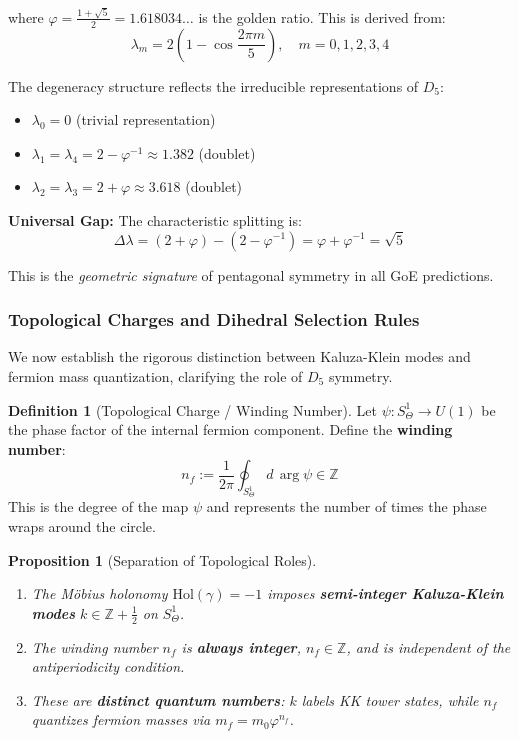 \documentclass[12pt]{article}
\theoremstyle{definition}
\newtheorem{definition}{Definition}
\theoremstyle{plain}
\newtheorem{proposition}{Proposition}
\begin{document}
where $\varphi = \frac{1+\sqrt{5}}{2} = 1.618034\ldots$ is the golden ratio. This is derived from:
\begin{equation}
\lambda_m = 2\left(1 - \cos\frac{2\pi m}{5}\right), \quad m = 0,1,2,3,4
\end{equation}

The degeneracy structure reflects the irreducible representations of $D_5$:
\begin{itemize}
\item $\lambda_0 = 0$ (trivial representation)
\item $\lambda_1 = \lambda_4 = 2 - \varphi^{-1} \approx 1.382$ (doublet)
\item $\lambda_2 = \lambda_3 = 2 + \varphi \approx 3.618$ (doublet)
\end{itemize}

\textbf{Universal Gap:} The characteristic splitting is:
\begin{equation}
\Delta\lambda = (2 + \varphi) - (2 - \varphi^{-1}) = \varphi + \varphi^{-1} = \sqrt{5}
\end{equation}

This is the \textit{geometric signature} of pentagonal symmetry in all GoE predictions.

\subsubsection{Topological Charges and Dihedral Selection Rules}
\label{sec:topological_charges}

We now establish the rigorous distinction between Kaluza-Klein modes and fermion mass quantization, clarifying the role of $D_5$ symmetry.

\begin{definition}[Topological Charge / Winding Number]
Let $\psi: S^1_\Theta \to U(1)$ be the phase factor of the internal fermion component. Define the \textbf{winding number}:
\begin{equation}
n_f := \frac{1}{2\pi} \oint_{S^1_\Theta} d\,\arg\psi \in \mathbb{Z}
\end{equation}
This is the degree of the map $\psi$ and represents the number of times the phase wraps around the circle.
\end{definition}

\begin{proposition}[Separation of Topological Roles]
\label{prop:kn_separation}
\begin{enumerate}
\item[(i)] The M\"obius holonomy $\text{Hol}(\gamma) = -1$ imposes \textbf{semi-integer Kaluza-Klein modes} $k \in \mathbb{Z} + \tfrac{1}{2}$ on $S^1_\Theta$.
\item[(ii)] The winding number $n_f$ is \textbf{always integer}, $n_f \in \mathbb{Z}$, and is \emph{independent} of the antiperiodicity condition.
\item[(iii)] These are \textbf{distinct quantum numbers}: $k$ labels KK tower states, while $n_f$ quantizes fermion masses via $m_f = m_0 \varphi^{n_f}$.
\end{enumerate}
\end{proposition}
\end{document}
